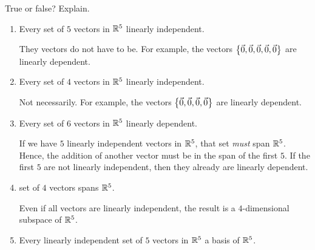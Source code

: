 \documentclass{ximera}
\author{Zack Reed}
\begin{document}
\begin{exercise}

    True or false? Explain.
    \begin{enumerate}
    \item Every set of $5$ vectors in $\mathbb{R}^5$  linearly independent.
        \begin{feedback}
          They vectors do not have to be. For example, the vectors
          $\left\{\vec{0},\vec{0},\vec{0},\vec{0},\vec{0}\right\}$ are
          linearly dependent. 
        \end{feedback}



    
    \item Every set of $4$ vectors in $\mathbb{R}^5$  linearly independent.
    
    \begin{feedback}
      Not necessarily. For example, the vectors
      $\left\{\vec{0},\vec{0},\vec{0},\vec{0}\right\}$ are linearly
      dependent.
    \end{feedback}


    

    \item Every set of $6$ vectors in $\mathbb{R}^5$  linearly dependent.

    \begin{feedback}
      If we have $5$ linearly independent vectors in $\mathbb{R}^5$, that set \emph{must} span $\mathbb{R}^5$. Hence, the addition of another vector must be in the span of the first $5$. If the first $5$ are not linearly independent, then they already are linearly dependent.
    \end{feedback}


    \item {} set of $4$ vectors spans $\mathbb{R}^5$.

    \begin{feedback}
      Even if all vectors are linearly independent, the result is a $4$-dimensional subspace of $\mathbb{R}^5$.
    \end{feedback}

    \item Every linearly independent set of $5$ vectors in $\mathbb{R}^5$  a basis of $\mathbb{R}^5$.


\end{enumerate}
\end{exercise}
\end{document}
